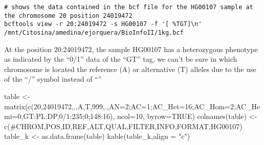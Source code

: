 \documentclass[
]{article}
\newenvironment{Shaded}{\begin{snugshade}}{\end{snugshade}}
\newcommand{\AttributeTok}[1]{\textcolor[rgb]{0.77,0.63,0.00}{#1}}
\newcommand{\ConstantTok}[1]{\textcolor[rgb]{0.00,0.00,0.00}{#1}}
\newcommand{\DecValTok}[1]{\textcolor[rgb]{0.00,0.00,0.81}{#1}}
\newcommand{\FunctionTok}[1]{\textcolor[rgb]{0.00,0.00,0.00}{#1}}
\newcommand{\NormalTok}[1]{#1}
\newcommand{\OtherTok}[1]{\textcolor[rgb]{0.56,0.35,0.01}{#1}}
\newcommand{\StringTok}[1]{\textcolor[rgb]{0.31,0.60,0.02}{#1}}
\begin{document}
\begin{verbatim}
# shows the data contained in the bcf file for the HG00107 sample at the chromosome 20 position 24019472
bcftools view -r 20:24019472 -s HG00107 -f '[ %TGT]\n' /mnt/Citosina/amedina/ejorquera/BioInfoII/1kg.bcf
\end{verbatim}

At the position 20:24019472, the sample HG00107 has a heterozygous
phenotype as indicated by the ``0/1'' data of the ``GT'' tag, we can't
be sure in which chromosome is located the reference (A) or alternative
(T) alleles due to the use of the ``/'' symbol instead of ``\textbar{}''

\begin{Shaded}
\begin{Highlighting}[]
\NormalTok{table }\OtherTok{\textless{}{-}} \FunctionTok{matrix}\NormalTok{(}\FunctionTok{c}\NormalTok{(}\StringTok{\textquotesingle{}20\textquotesingle{}}\NormalTok{,}\StringTok{\textquotesingle{}24019472\textquotesingle{}}\NormalTok{,}\StringTok{\textquotesingle{}.\textquotesingle{}}\NormalTok{,}\StringTok{\textquotesingle{}A\textquotesingle{}}\NormalTok{,}\StringTok{\textquotesingle{}T\textquotesingle{}}\NormalTok{,}\StringTok{\textquotesingle{}999\textquotesingle{}}\NormalTok{,}\StringTok{\textquotesingle{}.\textquotesingle{}}\NormalTok{,}\StringTok{\textquotesingle{}AN=2;AC=1;AC\_Het=16;AC\_Hom=2;AC\_Hemi=0\textquotesingle{}}\NormalTok{,}\StringTok{\textquotesingle{}GT:PL:DP\textquotesingle{}}\NormalTok{,}\StringTok{\textquotesingle{}0/1:235;0;148:16\textquotesingle{}}\NormalTok{), }\AttributeTok{ncol=}\DecValTok{10}\NormalTok{, }\AttributeTok{byrow=}\ConstantTok{TRUE}\NormalTok{)}
\FunctionTok{colnames}\NormalTok{(table) }\OtherTok{\textless{}{-}} \FunctionTok{c}\NormalTok{(}\StringTok{\textquotesingle{}\#CHROM\textquotesingle{}}\NormalTok{,}\StringTok{\textquotesingle{}POS\textquotesingle{}}\NormalTok{,}\StringTok{\textquotesingle{}ID\textquotesingle{}}\NormalTok{,}\StringTok{\textquotesingle{}REF\textquotesingle{}}\NormalTok{,}\StringTok{\textquotesingle{}ALT\textquotesingle{}}\NormalTok{,}\StringTok{\textquotesingle{}QUAL\textquotesingle{}}\NormalTok{,}\StringTok{\textquotesingle{}FILTER\textquotesingle{}}\NormalTok{,}\StringTok{\textquotesingle{}INFO\textquotesingle{}}\NormalTok{,}\StringTok{\textquotesingle{}FORMAT\textquotesingle{}}\NormalTok{,}\StringTok{\textquotesingle{}HG00107\textquotesingle{}}\NormalTok{)}
\NormalTok{table\_k }\OtherTok{\textless{}{-}} \FunctionTok{as.data.frame}\NormalTok{(table)}
\FunctionTok{kable}\NormalTok{(table\_k,}\AttributeTok{align =} \StringTok{"c"}\NormalTok{)}
\end{Highlighting}
\end{Shaded}
\end{document}
